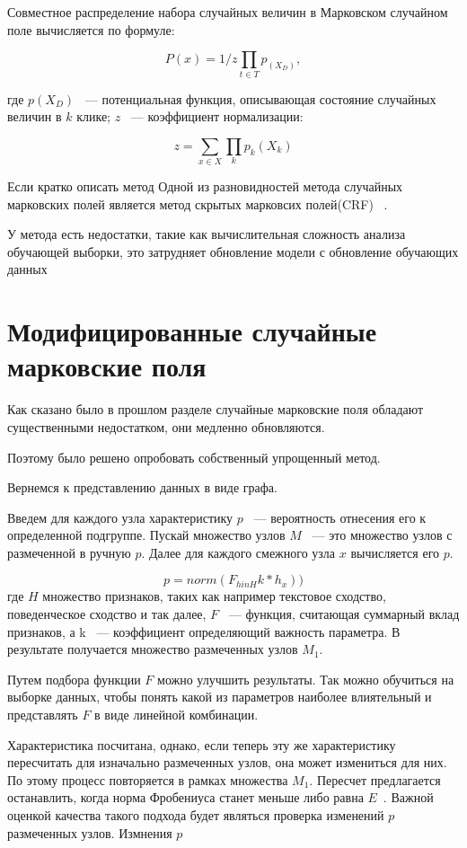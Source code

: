 \documentclass[annotation,times,page4]{itmo-student-thesis}
\begin{document}
Совместное распределение набора случайных величин в Марковском случайном поле вычисляется по формуле:

\[
    P(x) = 1/z\prod_{t \in T} p_(X_{D}),
\]

где $p (X_{D})$ ~--- потенциальная функция, описывающая состояние случайных величин в $k$ клике; $z$ ~--- коэффициент нормализации:

\[
    z = \sum_{x \in X}\prod_{k} p_{k} (X_{k})
\]

Если кратко описать метод
Одной из разновидностей метода случайных марковских полей является метод скрытых марковсих полей(CRF) ~\cite{lafferty2001conditional, антоноваметод}.

У метода есть недостатки, такие как вычислительная сложность анализа обучающей выборки, это затрудняет обновление модели с обновление обучающих данных 
\section{Модифицированные случайные марковские поля}
Как сказано было в прошлом разделе случайные марковские поля обладают существенными недостатком, они медленно обновляются.

Поэтому было решено опробовать собственный упрощенный метод.

Вернемся к представлению данных в виде графа. 

Введем для каждого узла характеристику $p$ ~--- вероятность отнесения его к определенной подгруппе. Пускай множество узлов $M$ ~--- это множество узлов с размеченной в ручную $p$. Далее для каждого смежного узла $x$ вычисляется его $p$. 

\[
    p = norm(F_{h in H}k*h_{x}))
\] 
где $H$ множество признаков, таких как например текстовое сходство, поведенческое сходство и так далее, $F$ ~--- функция, считающая суммарный вклад признаков, а k ~--- коэффициент определяющий важность параметра. В результате получается множество размеченных узлов $M_{1}$.

Путем подбора функции $F$ можно улучшить результаты. Так можно обучиться на выборке данных, чтобы понять какой из параметров наиболее влиятельный и представлять $F$ в виде линейной комбинации.

Характеристика посчитана, однако, если теперь эту же характеристику пересчитать для изначально размеченных узлов, она может измениться для них. По этому процесс повторяется в рамках множества $M_{1}$. Пересчет предлагается останавлить, когда норма Фробениуса станет меньше либо равна $E$~\cite{ланкастер1978теория}. Важной оценкой качества такого подхода будет являться проверка изменений $p$ размеченных узлов. Измнения $p$ 
\end{document}
